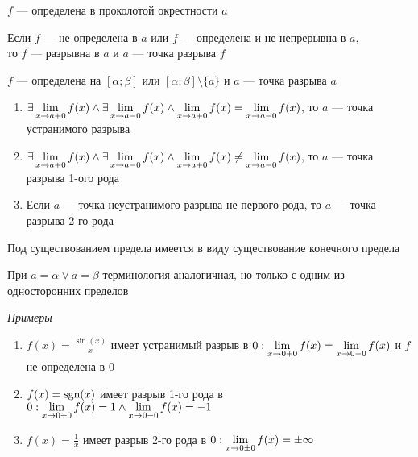 \documentclass{article}
\begin{document}


$f$ --- определена в проколотой окрестности $a$

Если $f$ --- не определена в $a$ или $f$ --- определена и не непрерывна в $a$,\\
то $f$ --- разрывна в $a$ и $a$ --- точка разрыва $f$



$f$ --- определена на $[\alpha;\beta]$ или $[\alpha;\beta]\setminus\{a\}$ и $a$ --- точка разрыва $a$

\begin{enumerate}
	\item $\exists \lim\limits_{x\to a+0}f(x)\land\exists \lim\limits_{x\to a-0}f(x)\land\lim\limits_{x \to a + 0} f(x) = \lim\limits_{x \to a - 0} f(x) $, то $a$ --- точка устранимого разрыва
	\item $\exists \lim\limits_{x \to a + 0} f(x)\land \exists \lim\limits_{x \to a - 0} f(x) \land\lim\limits_{x \to a + 0} f(x) \neq \lim\limits_{x \to a - 0} f(x)$, то $a$ --- точка разрыва 1-ого рода
	\item Если $a$ --- точка неустранимого разрыва не первого рода, то $a$ --- точка разрыва 2-го рода
\end{enumerate}

Под существованием предела имеется в виду существование конечного предела

При $a = \alpha \lor a= \beta$ терминология аналогичная, но только с одним из односторонних пределов

{\it Примеры}

\begin{enumerate}
	\item $f(x)=\frac{\sin(x)}{x}$ имеет устранимый разрыв в $0:\lim\limits_{x\to 0+0}f(x)=\lim\limits_{x\to 0-0}f(x)$ и $f$ не определена в $0$
	\item $f(x) = \text{sgn}(x)$ имеет разрыв 1-го рода в $0:\lim\limits_{x \to 0 + 0} f(x) = 1 \land \lim\limits_{x \to 0 - 0} f(x) = -1$
	\item $f(x) = \frac{1}{x}$ имеет разрыв 2-го рода в $0:\lim\limits_{x \to 0 \pm 0} f(x) = \pm \infty$
\end{enumerate}
\end{document}
